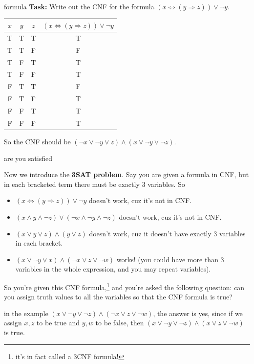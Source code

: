 \documentclass{beamer}
\begin{document}
\begin{frame}{formula}
\textbf{Task: } Write out the CNF for the formula $(x \Leftrightarrow (y \Rightarrow z)) \lor \neg y$.
\begin{center}
\begin{tabular}{|c|c|c|c|}
\hline
$x$ & $y$ & $z$ & $(x \Leftrightarrow (y \Rightarrow z)) \lor \neg y$\\
\hline
T & T & T & T\\
\hline
T & T & F & F\\
\hline
T & F & T & T\\
\hline
T & F & F & T\\
\hline
F & T & T & F\\
\hline
F & T & F & T\\
\hline
F & F & T & T\\
\hline
F & F & F & T\\
\hline
\end{tabular}
\end{center}
So the CNF should be $(\neg x \lor \neg y \lor z) \land (x \lor \neg y \lor \neg z)$.
\end{frame}

\begin{frame}{are you satisfied \emojiflushed}

Now we introduce the \textbf{3SAT problem}. Say you are given a formula in CNF, but in each bracketed term there must be exactly 3 variables. So
\begin{itemize}
\item $(x \Leftrightarrow (y \Rightarrow z)) \lor \neg y$ doesn't work, cuz it's not in CNF.
\item $(x \land y \land \neg z) \lor (\neg x \land \neg y \land \neg z)$ doesn't work, cuz it's not in CNF.
\item $(x \lor y \lor z) \land (y \lor z)$ doesn't work, cuz it doesn't have exactly 3 variables in each bracket.
\item $(x \lor \neg y \lor x) \land (\neg x \lor z \lor \neg w)$ works! (you could have more than 3 variables in the whole expression, and you may repeat variables).
\end{itemize}

So you're given this CNF formula,\footnote{it's in fact called a 3CNF formula!} and you're asked the following question: can you assign truth values to all the variables so that the CNF formula is true? 

\vspace{2mm}

in the example $(x \lor \neg y \lor \neg z) \land (\neg x \lor z \lor \neg w)$, the answer is yes, since if we assign $x, z$ to be true and $y, w$ to be false, then
$(x \lor \neg y \lor \neg z) \land (x \lor z \lor \neg w)$ is true.
\end{frame}
\end{document}
